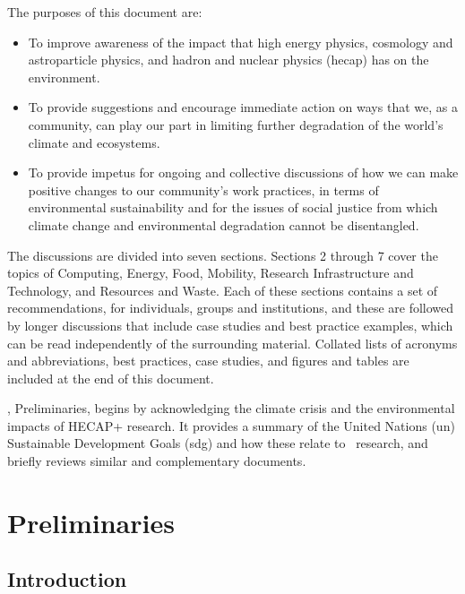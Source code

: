 \documentclass[../SustainableHEP.tex]{subfiles}
\begin{document}
The purposes of this document are:
\begin{itemize}
    \item To improve awareness of the impact that high energy physics, cosmology and astroparticle physics, and hadron and nuclear physics (\acrshort{hecap}) has on the environment.
    \item To provide suggestions and encourage immediate action on ways that we, as a community, can play our part in limiting further degradation of the world's climate and ecosystems.
    \item To provide impetus for ongoing and collective discussions of how we can make positive changes to our community's work practices, in terms of environmental sustainability and for the issues of social justice from which climate change and environmental degradation cannot be disentangled.
\end{itemize}
The discussions are divided into seven sections. Sections 2 through 7 cover the topics of Computing, Energy, Food, Mobility, Research Infrastructure and Technology, and Resources and Waste. Each of these sections contains a set of recommendations, for individuals, groups and institutions, and these are followed by longer discussions that include case studies and best practice examples, which can be read independently of the surrounding material. Collated lists of acronyms and abbreviations, best practices, case studies, and figures and tables are included at the end of this document.

, Preliminaries, begins by acknowledging the climate crisis and the environmental impacts of HECAP+ research. It provides a summary of the United Nations (\acrshort{un}) Sustainable Development Goals (\acrshort{sdg}) and how these relate to \ACR\ research, and briefly reviews similar and complementary documents.


\newpage

\section{Preliminaries}
\label{sec:Introduction}

\subsection{Introduction}
\end{document}
